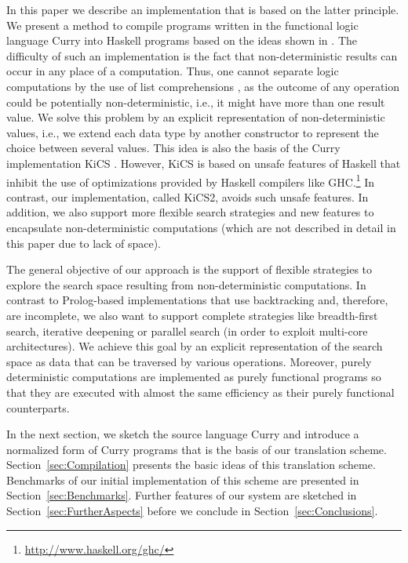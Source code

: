\documentclass{llncs}
\begin{document}
In this paper we describe an implementation that is based
on the latter principle. We present a method to compile
programs written in the functional logic language Curry \cite{Hanus06Curry}
into Haskell programs based on the ideas shown
in \cite{BrasselFischer08IFL}.
The difficulty of such an implementation is the fact
that non-deterministic results can occur in any place of a
computation. Thus, one cannot separate logic computations
by the use of list comprehensions \cite{Wadler85},
as the outcome of any operation could be potentially non-deterministic,
i.e., it might have more than one result value.
We solve this problem by an explicit representation of
non-deterministic values, i.e., we extend each data type by
another constructor to represent the choice between several values.
This idea is also the basis of the Curry implementation KiCS
\cite{BrasselHuch07,BrasselHuch09}.
However, KiCS is based on unsafe features of Haskell
that inhibit the use of optimizations provided by Haskell compilers
like GHC.\footnote{\url{http://www.haskell.org/ghc/}}
In contrast, our implementation, called KiCS2, avoids such unsafe features.
In addition, we also support more flexible search strategies
and new features to encapsulate non-deterministic computations
(which are not described in detail in this paper due to lack of space).

The general objective of our approach is the support
of flexible strategies to explore the search space
resulting from non-deterministic computations.
In contrast to Prolog-based implementations
that use backtracking and, therefore, are incomplete,
we also want to support complete strategies like breadth-first search,
iterative deepening or parallel search (in order to exploit
multi-core architectures). We achieve this goal by an
explicit representation of the search space as data
that can be traversed by various operations.
Moreover, purely deterministic computations
are implemented as purely functional programs so that
they are executed with almost the same efficiency
as their purely functional counterparts.

In the next section, we sketch the source language Curry
and introduce a normalized form of Curry programs that is the
basis of our translation scheme.
Section~\ref{sec:Compilation} presents the basic ideas
of this translation scheme.
Benchmarks of our initial implementation of this scheme
are presented in Section~\ref{sec:Benchmarks}.
Further features of our system are sketched in
Section~\ref{sec:FurtherAspects}
before we conclude in Section~\ref{sec:Conclusions}.
\end{document}
